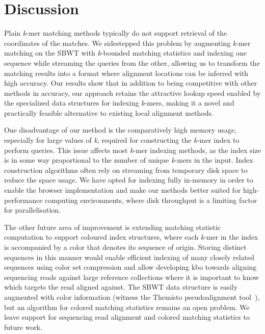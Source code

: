 \documentclass[unnumsec,webpdf,contemporary,large]{oup-authoring-template}%
\theoremstyle{thmstyleone}%
\theoremstyle{thmstyletwo}%
\theoremstyle{thmstylethree}%
\begin{document}
\section{Discussion}

Plain \emph{k}-mer matching methods typically do not support retrieval of the coordinates of the matches. We sidestepped this problem by augmenting \emph{k}-mer matching on the SBWT \cite{alanko2023small} with \emph{k}-bounded matching statistics \cite{alanko2023longest,alanko2024finimizers} and indexing one sequence while streaming the queries from the other, allowing us to transform the matching results into a format where alignment locations can be inferred with high accuracy. Our results show that in addition to being competitive with other methods in accuracy, our approach retains the attractive lookup speed enabled by the specialized data structures for indexing \emph{k}-mers, making it a novel and practically feasible alternative to existing local alignment methods.

One disadvantage of our method is the comparatively high memory usage, especially for large values of \emph{k}, required for constructing the \emph{k}-mer index to perform queries. This issue affects most \emph{k}-mer indexing methods, as the index size is in some way proportional to the number of unique \emph{k}-mers in the input. Index construction algorithms often rely on streaming from temporary disk space to reduce the space usage. We have opted for indexing fully in-memory in order to enable the browser implementation and make our methods better suited for high-performance computing environments, where disk throughput is a limiting factor for parallelisation.

The other future area of improvement is extending matching statistic computation to support coloured index structures, where each \emph{k}-mer in the index is accompanied by a color that denotes its sequence of origin. Storing distinct sequences in this manner would enable efficient indexing of many closely related sequences using color set compression and allow developing {\sf kbo} towards aligning sequencing reads against large reference collections where it is important to know which targets the read aligned against. The SBWT data structure is easily augmented with color information (witness the Themisto pseudoalignment tool~\cite{alanko2023themisto}), but an algorithm for colored matching statistics remains an open problem. We leave support for sequencing read alignment and colored matching statistics to future work.
\end{document}
